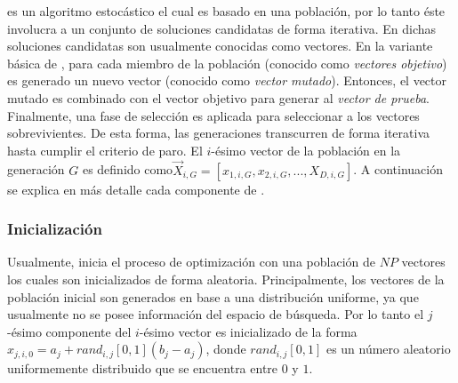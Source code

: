 \DE{} es un algoritmo estocástico el cual es basado en una población, por lo tanto éste involucra a un conjunto de soluciones candidatas de forma iterativa.
%
En \DE{} dichas soluciones candidatas son usualmente conocidas como vectores.
%
En la variante básica de \DE{}, para cada miembro de la población (conocido como \textit{vectores objetivo}) es generado un nuevo vector (conocido como \textit{vector mutado}).
%
Entonces, el vector mutado es combinado con el vector objetivo para generar al \textit{vector de prueba}.
%
Finalmente, una fase de selección es aplicada para seleccionar a los vectores sobrevivientes.
%
De esta forma, las generaciones transcurren de forma iterativa hasta cumplir el criterio de paro.
%
El $i$-ésimo vector de la población en la generación $G$ es definido como$\vec{X}_{i,G} = [x_{1,i,G}, x_{2,i,G},..., X_{D,i, G}]$.
%
A continuación se explica en más detalle cada componente de \DE{}.


\subsubsection{Inicialización}

Usualmente, \DE{} inicia el proceso de optimización con una población de $NP$ vectores los cuales son inicializados de forma aleatoria.
%
Principalmente, los vectores de la población inicial son generados en base a una distribución uniforme, ya que usualmente no se posee información del espacio de búsqueda.
%
Por lo tanto el $j$-ésimo componente del $i$-ésimo vector es inicializado de la forma $x_{j,i,0} = a_{j} + rand_{i,j}[0,1] (b_{j} - a_{j})$,
donde $rand_{i,j}[0,1]$ es un número aleatorio uniformemente distribuido que se encuentra entre $0$ y $1$.

